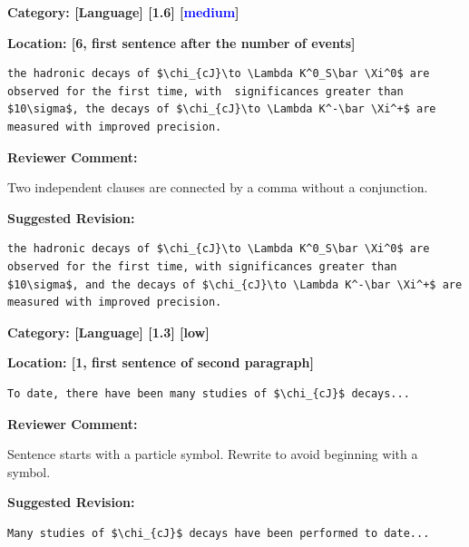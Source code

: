 \documentclass[12pt]{article}
\begin{document}
\begin{reviewer}
\noindent \textbf{Category: [Language] [1.6] [\textcolor{blue}{medium}]}

\noindent \textbf{Location: [6, first sentence after the number of events]}

\begin{lstlisting}[breaklines=true]
	the hadronic decays of $\chi_{cJ}\to \Lambda K^0_S\bar \Xi^0$ are observed for the first time, with  significances greater than $10\sigma$, the decays of $\chi_{cJ}\to \Lambda K^-\bar \Xi^+$ are measured with improved precision.
\end{lstlisting}

\textbf{Reviewer Comment:}

Two independent clauses are connected by a comma without a conjunction.

\textbf{Suggested Revision:}

\begin{lstlisting}[breaklines=true]
	the hadronic decays of $\chi_{cJ}\to \Lambda K^0_S\bar \Xi^0$ are observed for the first time, with significances greater than $10\sigma$, and the decays of $\chi_{cJ}\to \Lambda K^-\bar \Xi^+$ are measured with improved precision.
\end{lstlisting}

\end{reviewer}

\begin{reviewer}
\noindent \textbf{Category: [Language] [1.3] [low]}

\noindent \textbf{Location: [1, first sentence of second paragraph]}

\begin{lstlisting}[breaklines=true]
	To date, there have been many studies of $\chi_{cJ}$ decays...
\end{lstlisting}

\textbf{Reviewer Comment:}

Sentence starts with a particle symbol. Rewrite to avoid beginning with a symbol.

\textbf{Suggested Revision:}

\begin{lstlisting}[breaklines=true]
	Many studies of $\chi_{cJ}$ decays have been performed to date...
\end{lstlisting}

\end{reviewer}
\end{document}
